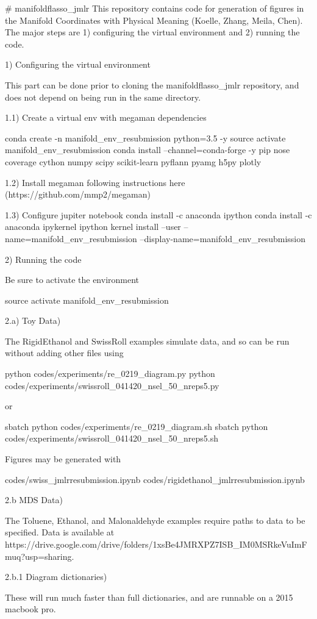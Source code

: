 # manifoldflasso_jmlr
This repository contains code for generation of figures in the Manifold Coordinates with Physical Meaning (Koelle, Zhang, Meila, Chen).
The major steps are 1) configuring the virtual environment and 2) running the code.

1) Configuring the virtual environment

This part can be done prior to cloning the manifoldflasso_jmlr repository, and does not depend on being run in the same directory.

1.1) Create a virtual env with megaman dependencies

conda create -n manifold_env_resubmission python=3.5 -y
source activate manifold_env_resubmission
conda install --channel=conda-forge -y pip nose coverage cython numpy scipy scikit-learn pyflann pyamg h5py plotly

1.2) Install megaman following instructions here (https://github.com/mmp2/megaman)

1.3) Configure jupiter notebook
conda install -c anaconda ipython
conda install -c anaconda ipykernel
ipython kernel install --user --name=manifold_env_resubmission --display-name=manifold_env_resubmission

2) Running the code

Be sure to activate the environment

source activate manifold_env_resubmission

2.a) Toy Data)

The RigidEthanol and SwissRoll examples simulate data, and so can be run without adding other files using 

python codes/experiments/re_0219_diagram.py
python codes/experiments/swissroll_041420_nsel_50_nreps5.py

or

sbatch python codes/experiments/re_0219_diagram.sh
sbatch python codes/experiments/swissroll_041420_nsel_50_nreps5.sh

Figures may be generated with 

codes/swiss_jmlrresubmission.ipynb
codes/rigidethanol_jmlrresubmission.ipynb

2.b MDS Data)

The Toluene, Ethanol, and Malonaldehyde examples require paths to data to be specified.
 Data is available at https://drive.google.com/drive/folders/1xsBe4JMRXPZ7ISB_IM0MSRkeVuImFmuq?usp=sharing.

2.b.1 Diagram dictionaries)

These will run much faster than full dictionaries, and are runnable on a 2015 macbook pro.


